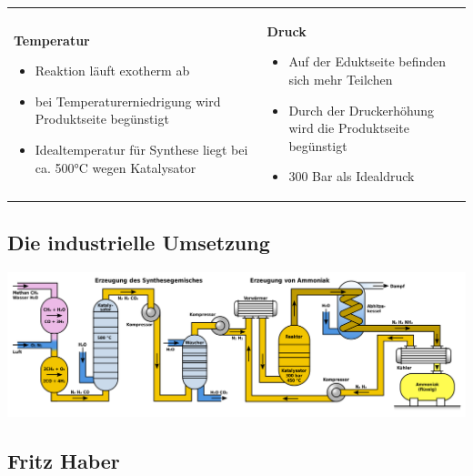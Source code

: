 \documentclass[11pt]{article}
\begin{document}
    \hspace{-.75cm}\begin{tabular}{m{8.5cm} m{8.5cm}} 
        \textbf{Temperatur}
        \begin{itemize}
            \item Reaktion läuft exotherm ab
            \item bei Temperaturerniedrigung wird Produktseite begünstigt
            \item Idealtemperatur für Synthese liegt bei ca. 500°C wegen Katalysator
        \end{itemize}
        &
        \textbf{Druck}
        \begin{itemize}
            \item Auf der Eduktseite befinden sich mehr Teilchen
            \item Durch der Druckerhöhung wird die Produktseite begünstigt
            \item 300 Bar als Idealdruck
        \end{itemize}
        
    \end{tabular}
        
\subsection*{Die industrielle Umsetzung} 
    
        \begin{center}
            \includegraphics[scale=.31]{Haber-Bosch-Process.png}    
        \end{center}

\subsection*{Fritz Haber}
\end{document}
